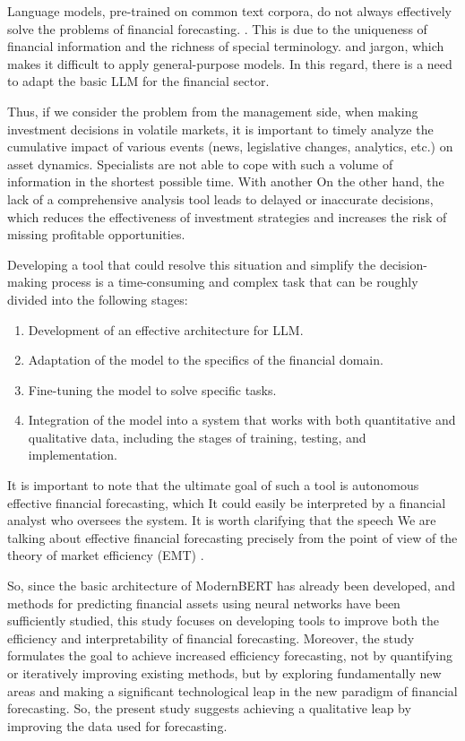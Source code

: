 Language models, pre-trained on common text corpora, do not always effectively solve the problems of financial forecasting.
\parencite{Jiang2023}. This is due to the uniqueness of financial information and the richness of special terminology.
and jargon, which makes it difficult to apply general-purpose models. In this regard, there is a need to adapt
the basic LLM for the financial sector.

Thus, if we consider the problem from the management side, when making investment decisions in volatile markets,
it is important to timely analyze the cumulative impact of various events (news, legislative changes, analytics, etc.)
on asset dynamics. Specialists are not able to cope with such a volume of information in the shortest possible time. With another
On the other hand, the lack of a comprehensive analysis tool leads to delayed or inaccurate decisions, which reduces
the effectiveness of investment strategies and increases the risk of missing profitable opportunities.

Developing a tool that could resolve this situation and simplify the decision-making process is a time-consuming
and complex task that can be roughly divided into the following stages:

\begin{enumerate}
    \item Development of an effective architecture for LLM.
    \item Adaptation of the model to the specifics of the financial domain.
    \item Fine-tuning the model to solve specific tasks.
    \item Integration of the model into a system that works with both quantitative and qualitative data,
    including the stages of training, testing, and implementation.
\end{enumerate}

It is important to note that the ultimate goal of such a tool is autonomous effective financial forecasting, which
It could easily be interpreted by a financial analyst who oversees the system. It is worth clarifying that the speech
We are talking about effective financial forecasting precisely from the point of view of the theory of market efficiency (EMT) \parencite{emt1970fama}.

So, since the basic architecture of ModernBERT has already been developed, and methods for predicting financial assets using neural
networks have been sufficiently studied, this study focuses on developing tools to improve both the efficiency and
interpretability of financial forecasting. Moreover, the study formulates the goal to achieve increased efficiency forecasting,
not by quantifying or iteratively improving existing methods, but by exploring fundamentally new areas and making a significant
technological leap in the new paradigm of financial forecasting. So, the present study suggests
achieving a qualitative leap by improving the data used for forecasting.

